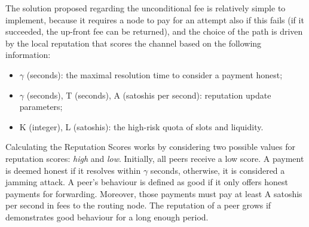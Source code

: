 The solution proposed regarding the unconditional fee is relatively simple to implement, 
because it requires a node to pay for an attempt also if this fails (if it succeeded, the up-front fee can 
be returned), and the choice of the path is driven by the local reputation that 
scores the channel based on the following information:

\begin{itemize}
    \item  $\gamma$ (seconds): the maximal resolution time to consider a payment honest;
    \item  $\gamma$  (seconds), T (seconds), A (satoshis per second): reputation update 
    parameters;
    \item  K (integer), L (satoshis): the high-risk quota of slots and liquidity.
\end{itemize}


Calculating the Reputation Scores works by considering two possible values
for reputation scores:  \emph{high}  and  \emph{low}. Initially, all peers 
receive a low score. A payment is deemed  honest  if it resolves within  
$\gamma$  seconds, otherwise, it is considered a jamming attack. 
A peer’s behaviour is defined as  good  if it only offers honest payments 
for forwarding. Moreover, those payments must pay at least A satoshis 
per second in fees to the routing node. The reputation of a peer grows if 
demonstrates good behaviour for a long enough period.
